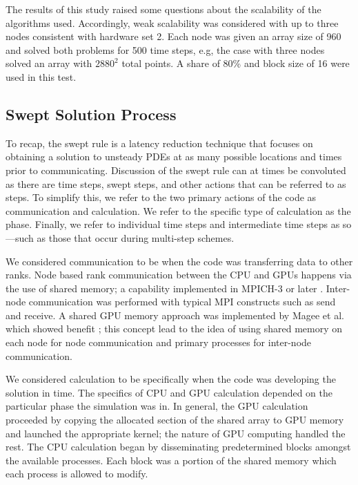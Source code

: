 \documentclass[journal,article,submit,moreauthors,pdftex]{Definitions/mdpi}
\begin{document}
\par 
The results of this study raised some questions about the scalability of the algorithms used. Accordingly, weak scalability was considered with up to three nodes consistent with hardware set 2. Each node was given an array size of 960 and solved both problems for 500 time steps, e.g, the case with three nodes solved an array with $2880^2$ total points. A share of 80\% and block size of 16 were used in this test. 

\subsection{Swept Solution Process}
\label{swept-process-section}
To recap, the swept rule is a latency reduction technique that focuses on obtaining a solution to unsteady PDEs at as many possible locations and times prior to communicating. Discussion of the swept rule can at times be convoluted as there are time steps, swept steps, and other actions that can be referred to as steps. To simplify this, we refer to the two primary actions of the code as communication and calculation. We refer to the specific type of calculation as the phase. Finally, we refer to individual time steps and intermediate time steps as so---such as those that occur during multi-step schemes. 

\par
 We considered communication to be when the code was transferring data to other ranks. Node based rank communication between the CPU and GPUs happens via the use of shared memory; a capability implemented in MPICH-3 or later \cite{Hoefler2013MPIMemory}. Inter-node communication was performed with typical MPI constructs such as send and receive. A shared GPU memory approach was implemented by Magee et al. which showed benefit \cite{Magee2018AcceleratingDecomposition}; this concept lead to the idea of using shared memory on each node for node communication and primary processes for inter-node communication.
 
 \par
 We considered calculation to be specifically when the code was developing the solution in time. The specifics of CPU and GPU calculation depended on the particular phase the simulation was in. In general, the GPU calculation proceeded by copying the allocated section of the shared array to GPU memory and launched the appropriate kernel; the nature of GPU computing handled the rest. The CPU calculation began by disseminating predetermined blocks amongst the available processes. Each block was a portion of the shared memory which each process is allowed to modify.
 
\end{document}
